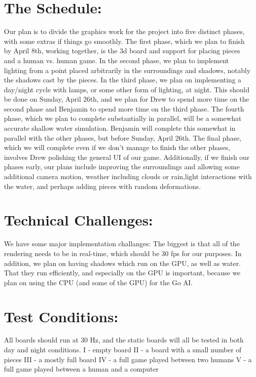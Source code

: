 \documentclass[12pt,a4paper]{report}
\begin{document}
\section*{The Schedule:}
Our plan is to divide the graphics work for the project into five distinct phases, with some extras if things go smoothly.
The first phase, which we plan to finish by April 8th, working together, is the 3d board and support for placing pieces and a human vs. human game.
In the second phase, we plan to implement lighting from a point placed arbitrarily in the surroundings and shadows, notably the shadows cast by the pieces.
In the third phase, we plan on implementing a day/night cycle with lamps, or some other form of lighting, at night. This should be done on Sunday, April 26th, and we plan for Drew to spend more time on the second phase and Benjamin to spend more time on the third phase.
The fourth phase, which we plan to complete substantially in parallel, will be a somewhat accurate shallow water simulation. Benjamin will complete this somewhat in parallel with the other phases, but before Sunday, April 26th.
The final phase, which we will complete even if we don't manage to finish the other phases, involves Drew polishing the general UI of our game.
Additionally, if we finish our phases early, our plans include improving the surroundings and allowing some additional camera motion, weather including clouds or rain,light interactions with the water, and perhaps adding pieces with random deformations.

\section*{Technical Challenges:}
We have some major implementation challanges:
The biggest is that all of the rendering needs to be in real-time, which should be 30 fps for our purposes.
In addition, we plan on having shadows which run on the GPU, as well as water.
That they run efficiently, and especially on the GPU is important, because we plan on using the CPU (and some of the GPU) for the Go AI.

\section*{Test Conditions:}
All boards should run at 30 Hz, and the static boards will all be tested in both day and night conditions.\newline
I - empty board\newline
II - a board with a small number of pieces\newline
III - a mostly full board\newline
IV - a full game played between two humans\newline
V - a full game played between a human and a computer\newline



\end{document}
